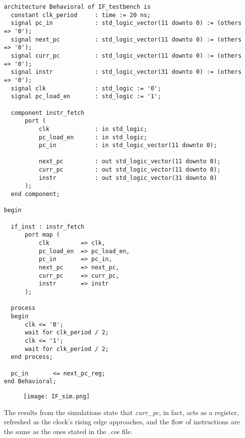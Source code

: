 \begin{verbatim}
architecture Behavioral of IF_testbench is
  constant clk_period     : time := 20 ns;
  signal pc_in            : std_logic_vector(11 downto 0) := (others => '0');
  signal next_pc          : std_logic_vector(11 downto 0) := (others => '0');
  signal curr_pc          : std_logic_vector(11 downto 0) := (others => '0');
  signal instr            : std_logic_vector(31 downto 0) := (others => '0');
  signal clk              : std_logic := '0';
  signal pc_load_en       : std_logic := '1';
  
  component instr_fetch
      port ( 
          clk             : in std_logic;
          pc_load_en      : in std_logic;
          pc_in           : in std_logic_vector(11 downto 0);
          
          next_pc         : out std_logic_vector(11 downto 0);
          curr_pc         : out std_logic_vector(11 downto 0);
          instr           : out std_logic_vector(31 downto 0)
      );
  end component;

begin

  if_inst : instr_fetch
      port map (
          clk         => clk,
          pc_load_en  => pc_load_en,
          pc_in       => pc_in,
          next_pc     => next_pc,
          curr_pc     => curr_pc,
          instr       => instr
      );

  process
  begin
      clk <= '0';
      wait for clk_period / 2;
      clk <= '1';
      wait for clk_period / 2;
  end process;

  pc_in       <= next_pc_reg;
end Behavioral;
\end{verbatim}

\begin{figure}[h!]
  \texttt{[image: IF\_sim.png]}
\end{figure}

The results from the simulations state that \emph{curr{\_}pc}, in fact, acts as a register, refreshed as the clock's rising edge approaches, and the flow of instructions are the same as the ones stated in the \emph{.coe} file. 
\let\cleardoublepage\clearpage